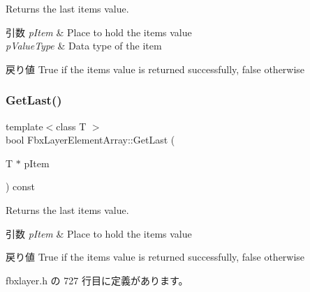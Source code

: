 Returns the last item\textquotesingle{}s value. 
\begin{DoxyParams}{引数}
{\em p\+Item} & Place to hold the item\textquotesingle{}s value \\
\hline
{\em p\+Value\+Type} & Data type of the item \\
\hline
\end{DoxyParams}
\begin{DoxyReturn}{戻り値}
{\ttfamily True} if the item\textquotesingle{}s value is returned successfully, {\ttfamily false} otherwise 
\end{DoxyReturn}
\mbox{\label{class_fbx_layer_element_array_a151426ccb1c4c28550c637716fdb7b64}} 
\subsubsection{\texorpdfstring{Get\+Last()}{GetLast()}\hspace{0.1cm}{\footnotesize\ttfamily [2/2]}}
{\footnotesize\ttfamily template$<$class T $>$ \\
bool Fbx\+Layer\+Element\+Array\+::\+Get\+Last (\begin{DoxyParamCaption}\item[{T $\ast$}]{p\+Item }\end{DoxyParamCaption}) const\hspace{0.3cm}{\ttfamily [inline]}}

Returns the last item\textquotesingle{}s value. 
\begin{DoxyParams}{引数}
{\em p\+Item} & Place to hold the item\textquotesingle{}s value \\
\hline
\end{DoxyParams}
\begin{DoxyReturn}{戻り値}
{\ttfamily True} if the item\textquotesingle{}s value is returned successfully, {\ttfamily false} otherwise 
\end{DoxyReturn}


 fbxlayer.\+h の 727 行目に定義があります。

\mbox{\label{class_fbx_layer_element_array_a34ac50b866b0615109329c114e612b83}} 
